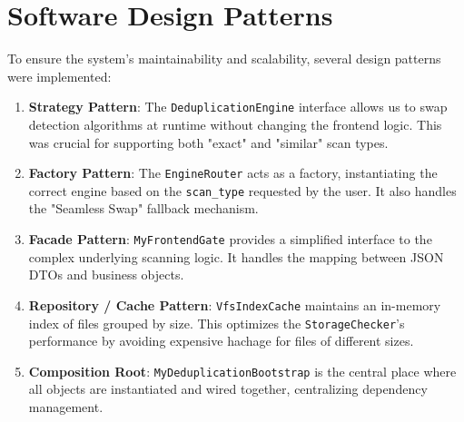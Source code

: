 \section{Software Design Patterns}
To ensure the system's maintainability and scalability, several design patterns were implemented:

\begin{enumerate}
    \item \textbf{Strategy Pattern}: The \texttt{DeduplicationEngine} interface allows us to swap detection algorithms at runtime without changing the frontend logic. This was crucial for supporting both "exact" and "similar" scan types.
    \item \textbf{Factory Pattern}: The \texttt{EngineRouter} acts as a factory, instantiating the correct engine based on the \texttt{scan\_type} requested by the user. It also handles the "Seamless Swap" fallback mechanism.
    \item \textbf{Facade Pattern}: \texttt{MyFrontendGate} provides a simplified interface to the complex underlying scanning logic. It handles the mapping between JSON DTOs and business objects.
    \item \textbf{Repository / Cache Pattern}: \texttt{VfsIndexCache} maintains an in-memory index of files grouped by size. This optimizes the \texttt{StorageChecker}'s performance by avoiding expensive hachage for files of different sizes.
    \item \textbf{Composition Root}: \texttt{MyDeduplicationBootstrap} is the central place where all objects are instantiated and wired together, centralizing dependency management.
\end{enumerate}
